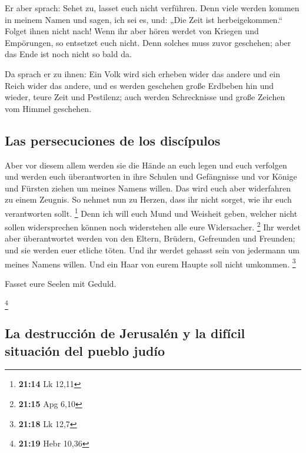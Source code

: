  Er aber sprach: Sehet zu, lasset euch nicht verführen.
Denn viele werden kommen in meinem Namen und sagen, ich sei es, und:
„Die Zeit ist herbeigekommen.`` Folget ihnen nicht nach! 
Wenn ihr aber hören werdet von Kriegen und Empörungen, so entsetzet euch
nicht. Denn solches muss zuvor geschehen; aber das Ende ist noch nicht
so bald da.

 Da sprach er zu ihnen: Ein Volk wird sich erheben wider
das andere und ein Reich wider das andere,  und es werden
geschehen große Erdbeben hin und wieder, teure Zeit und Pestilenz; auch
werden Schrecknisse und große Zeichen vom Himmel geschehen.

\hypertarget{las-persecuciones-de-los-discuxedpulos}{%
\subsection{Las persecuciones de los
discípulos}\label{las-persecuciones-de-los-discuxedpulos}}

 Aber vor diesem allem werden sie die Hände an euch legen
und euch verfolgen und werden euch überantworten in ihre Schulen und
Gefängnisse und vor Könige und Fürsten ziehen um meines Namens willen.
 Das wird euch aber widerfahren zu einem Zeugnis.
 So nehmet nun zu Herzen, dass ihr nicht sorget, wie ihr
euch verantworten sollt. \footnote{\textbf{21:14} Lk 12,11}
 Denn ich will euch Mund und Weisheit geben, welcher
nicht sollen widersprechen können noch widerstehen alle eure
Widersacher. \footnote{\textbf{21:15} Apg 6,10}  Ihr
werdet aber überantwortet werden von den Eltern, Brüdern, Gefreunden und
Freunden; und sie werden euer etliche töten.  Und ihr
werdet gehasst sein von jedermann um meines Namens willen.
 Und ein Haar von eurem Haupte soll nicht umkommen.
\footnote{\textbf{21:18} Lk 12,7}

 Fasset eure Seelen mit Geduld.

\footnote{\textbf{21:19} Hebr 10,36}

\hypertarget{la-destrucciuxf3n-de-jerusaluxe9n-y-la-difuxedcil-situaciuxf3n-del-pueblo-juduxedo}{%
\subsection{La destrucción de Jerusalén y la difícil situación del
pueblo
judío}\label{la-destrucciuxf3n-de-jerusaluxe9n-y-la-difuxedcil-situaciuxf3n-del-pueblo-juduxedo}}

